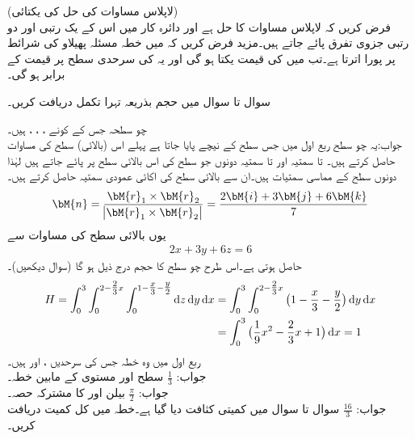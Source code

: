\quad (لاپلاس مساوات کی حل کی یکتائی)\\
فرض کریں کہ  لاپلاس مساوات کا حل ہے اور دائرہ کار  میں اس کے یک رتبی اور دو رتبی جزوی تفرق پائے جاتے ہیں۔مزید فرض کریں کہ  میں خطہ   مسئلہ پھیلاو کی شرائط پر پورا اترتا ہے۔تب  میں  کی قیمت یکتا ہو گی اور یہ  کی سرحدی سطح  پر قیمت کے برابر ہو گی۔

سوال  تا سوال  میں حجم بذریعہ تہرا تکمل دریافت کریں۔

\quad چو سطحہ جس کے کونے ، ، ،  ہیں۔\\
جواب:\quad یہ چو سطح ربع اول میں جس سطح  کے نیچے پایا جاتا ہے پہلے اس (بالائی) سطح کی مساوات حاصل کرتے ہیں۔  تا  سمتیہ  اور  تا  سمتیہ  دونوں جو سطح کی اس بالائی سطح پر پائے جاتے ہیں لہٰذا دونوں سطح کے مماسی سمتیات ہیں۔ان سے بالائی سطح کی اکائی عمودی سمتیہ  حاصل کرتے ہیں۔
\begin{align*}
\bM{n}=\frac{\bM{r}_1\times \bM{r}_2}{\abs{\bM{r}_1\times \bM{r}_2}}=\frac{2\bM{i}+3\bM{j}+6\bM{k}}{7}
\end{align*}
یوں بالائی سطح کی مساوات  سے
\begin{align*}
2x+3y+6z=6
\end{align*}
حاصل ہوتی ہے۔اس طرح چو سطح کا حجم درج ذیل ہو گا (سوال  دیکھیں)۔
\begin{align*}
H=\int_0^3\int_0^{2-\tfrac{2}{3}x}\int_0^{1-\tfrac{x}{3}-\tfrac{y}{2}} \dif z\dif y\dif x&=\int_0^3\int_0^{2-\tfrac{2}{3}x}\big(1-\frac{x}{3}-\frac{y}{2}\big)\dif y\dif x\\
&=\int_0^3 \big(\frac{1}{9}x^2-\frac{2}{3}x+1\big)\dif x=1
\end{align*}
\quad ربع اول میں وہ خطہ جس کی سرحدیں ،  اور  ہیں۔\\
جواب:\quad 
$\tfrac{1}{3}$
\quad سطح  اور  مستوی  کے مابین خطہ۔\\
جواب:\quad 
$\tfrac{\pi}{2}$
\quad بیلن  اور  کا مشترکہ حصہ۔\\
جواب:\quad 
$\tfrac{16}{3}$
سوال  تا سوال  میں کمیتی کثافت  دیا گیا ہے۔خطہ  میں کل کمیت دریافت کریں۔

